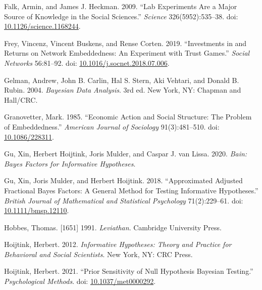 \documentclass[
  11pt,
]{article}
\newlength{\cslhangindent}
\newlength{\cslentryspacingunit} %
\newenvironment{CSLReferences}[2] %
 {%
  \setlength{\parindent}{0pt}
  \ifodd #1
  \let\oldpar\par
  \def\par{\hangindent=\cslhangindent\oldpar}
  \fi
  \setlength{\parskip}{#2\cslentryspacingunit}
 }%
 {}
\begin{document}
\begin{CSLReferences}{1}{0}
\leavevmode{}%
Falk, Armin, and James J. Heckman. 2009. {``Lab Experiments Are a Major Source of Knowledge in the Social Sciences.''} \emph{Science} 326(5952):535--38. doi: \href{https://doi.org/10.1126/science.1168244}{10.1126/science.1168244}.

\leavevmode{}%
Frey, Vincenz, Vincent Buskens, and Rense Corten. 2019. {``Investments in and Returns on Network Embeddedness: An Experiment with Trust Games.''} \emph{Social Networks} 56:81--92. doi: \href{https://doi.org/10.1016/j.socnet.2018.07.006}{10.1016/j.socnet.2018.07.006}.

\leavevmode{}%
Gelman, Andrew, John B. Carlin, Hal S. Stern, Aki Vehtari, and Donald B. Rubin. 2004. \emph{Bayesian Data Analysis}. 3rd ed. New York, NY: {Chapman and Hall/CRC}.

\leavevmode{}%
Granovetter, Mark. 1985. {``Economic Action and Social Structure: The Problem of Embeddedness.''} \emph{American Journal of Sociology} 91(3):481--510. doi: \href{https://doi.org/10.1086/228311}{10.1086/228311}.

\leavevmode{}%
Gu, Xin, Herbert Hoijtink, Joris Mulder, and Caspar J. van Lissa. 2020. \emph{Bain: Bayes Factors for Informative Hypotheses}.

\leavevmode{}%
Gu, Xin, Joris Mulder, and Herbert Hoijtink. 2018. {``Approximated Adjusted Fractional Bayes Factors: A General Method for Testing Informative Hypotheses.''} \emph{British Journal of Mathematical and Statistical Psychology} 71(2):229--61. doi: \href{https://doi.org/10.1111/bmsp.12110}{10.1111/bmsp.12110}.

\leavevmode{}%
Hobbes, Thomas. {[}1651{]} 1991. \emph{Leviathan}. Cambridge University Press.

\leavevmode{}%
Hoijtink, Herbert. 2012. \emph{Informative {H}ypotheses: {T}heory and {P}ractice for {B}ehavioral and {S}ocial {S}cientists}. New York, NY: CRC Press.

\leavevmode{}%
Hoijtink, Herbert. 2021. {``Prior Sensitivity of Null Hypothesis Bayesian Testing.''} \emph{Psychological Methods}. doi: \href{https://doi.org/10.1037/met0000292}{10.1037/met0000292}.


\end{CSLReferences}
\end{document}
